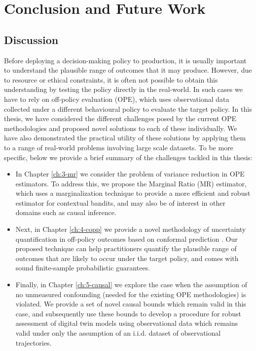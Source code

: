 \chapter{\label{ch:6-conclusion}Conclusion and Future Work} 

\minitoc

\section{Discussion}

Before deploying a decision-making policy to production, it is usually important to understand the
plausible range of outcomes that it may produce. However, due to resource or ethical constraints, it is
often not possible to obtain this understanding by testing the policy directly in the real-world. In such
cases we have to rely on off-policy evaluation (OPE), which uses observational data collected under a different behavioural policy to evaluate the target policy. 
In this thesis, we have considered the different challenges posed by the current OPE methodologies and proposed novel solutions to each of these individually.
We have also demonstrated the practical utility of these solutions by applying them to a range of real-world problems involving large scale datasets.
To be more specific, below we provide a brief summary of the challenges tackled in this thesis:
\begin{itemize}
    \item In Chapter \ref*{ch:3-mr} we consider the problem of variance reduction in OPE estimators. To address this, we propose the Marginal Ratio (MR) estimator, which uses a marginalization technique to provide a more efficient and robust estimator for contextual bandits, and may also be of interest in other domains such as causal inference. 
    \item Next, in Chapter \ref*{ch:4-copp} we provide a novel methodology of uncertainty quantification in off-policy outcomes based on conformal prediction \citep{vovk2005algorithmic}. Our proposed technique can help practitioners quantify the plausible range of outcomes that are likely to occur under the target policy, and comes with sound finite-sample probabilistic guarantees.
    \item Finally, in Chapter \ref*{ch:5-causal} we explore the case when the assumption of no unmeasured confounding (needed for the existing OPE methodologies) is violated. 
    We provide a set of novel causal bounds which remain valid in this case, and subsequently use these bounds to develop a procedure for robust assessment of digital twin models using observational data which remains valid under only the assumption of an i.i.d. dataset of observational trajectories. 
\end{itemize}

